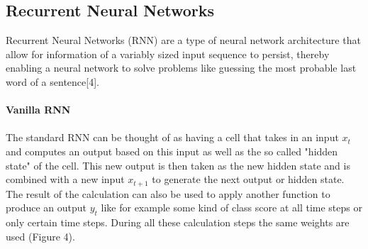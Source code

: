 \documentclass{article}
\begin{document}
\subsection{Recurrent Neural Networks}
Recurrent Neural Networks (RNN) are a type of neural network architecture that allow for information of a variably sized input sequence to persist, thereby enabling a neural network to solve problems like guessing the most probable last word of a sentence[4].\\\\
\textbf{Vanilla RNN}\\\\
The standard RNN can be thought of as having a cell that takes in an input \(x_t\) and computes an output based on this input as well as the so called "hidden state" of the cell. This new output is then taken as the new hidden state and is combined with a new input \(x_{t+1}\) to generate the next output or hidden state. The result of the calculation can also be used to apply another function to produce an output \(y_t\) like for example some kind of class score at all time steps or only certain time steps. During all these calculation steps the same weights are used (Figure 4).
\end{document}
